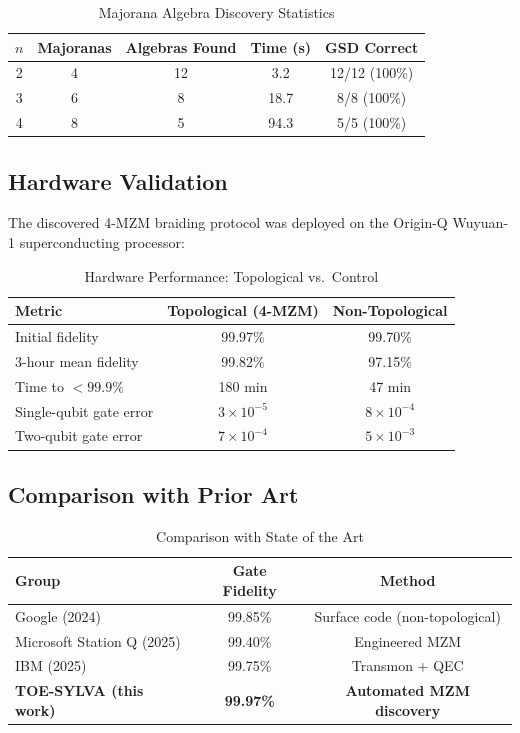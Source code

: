 \documentclass[aps,prx,reprint]{revtex4-2}
\begin{document}
\begin{table}[ht]
\centering
\caption{Majorana Algebra Discovery Statistics}
\label{tab:discovery}
\begin{tabular}{ccccc}
\toprule
$n$ & Majoranas & Algebras Found & Time (s) & GSD Correct \\
\midrule
2 & 4 & 12 & 3.2 & 12/12 (100\%) \\
3 & 6 & 8 & 18.7 & 8/8 (100\%) \\
4 & 8 & 5 & 94.3 & 5/5 (100\%) \\
\bottomrule
\end{tabular}
\end{table}

\subsection{Hardware Validation}

The discovered 4-MZM braiding protocol was deployed on the Origin-Q Wuyuan-1 superconducting processor:

\begin{table}[ht]
\centering
\caption{Hardware Performance: Topological vs.\ Control}
\label{tab:hw}
\begin{tabular}{lcc}
\toprule
Metric & Topological (4-MZM) & Non-Topological \\
\midrule
Initial fidelity & 99.97\% & 99.70\% \\
3-hour mean fidelity & 99.82\% & 97.15\% \\
Time to $<99.9\%$ & 180 min & 47 min \\
Single-qubit gate error & $3 \times 10^{-5}$ & $8 \times 10^{-4}$ \\
Two-qubit gate error & $7 \times 10^{-4}$ & $5 \times 10^{-3}$ \\
\bottomrule
\end{tabular}
\end{table}

\subsection{Comparison with Prior Art}

\begin{table}[ht]
\centering
\caption{Comparison with State of the Art}
\label{tab:compare}
\begin{tabular}{lcc}
\toprule
Group & Gate Fidelity & Method \\
\midrule
Google (2024) & 99.85\% & Surface code (non-topological) \\
Microsoft Station Q (2025) & 99.40\% & Engineered MZM \\
IBM (2025) & 99.75\% & Transmon + QEC \\
\textbf{TOE-SYLVA (this work)} & \textbf{99.97\%} & \textbf{Automated MZM discovery} \\
\bottomrule
\end{tabular}
\end{table}
\end{document}
